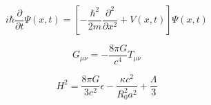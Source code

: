 \documentclass{article}
\begin{document}
\begin{equation}
    i\hbar \frac{\partial}{\partial t}\Psi (x,t) = \left[-\frac{\hbar^2}{2m}\frac{\partial^2}{\partial x^2} + V(x,t)\right]\Psi(x,t)
\end{equation}

\begin{equation}
    G_{\mu \nu} = -\frac{8\pi G}{c^4} T_{\mu \nu}
\end{equation}

\begin{equation}
    H^2 = \frac{8\pi G}{3c^2}\epsilon - \frac{\kappa c^2}{R_0^2 a^2} + \frac{\Lambda}{3}
\end{equation}
\end{document}
